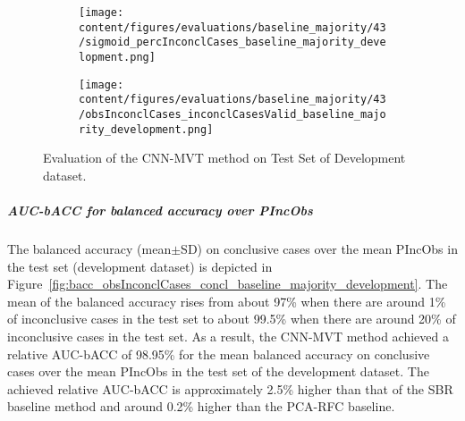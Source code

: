 \begin{figure}[ht]
  \begin{subfigure}{0.48\textwidth}
    \centering
    \texttt{[image: content/figures/evaluations/baseline\_majority/43/sigmoid\_percInconclCases\_baseline\_majority\_development.png]}
    \label{fig:baseline_majority_percInconclCases_development}
  \end{subfigure}
  \hfill
  \begin{subfigure}{0.495\textwidth}
    \centering
    \texttt{[image: content/figures/evaluations/baseline\_majority/43/obsInconclCases\_inconclCasesValid\_baseline\_majority\_development.png]}
    \label{fig:obsInconclCases_inconclCasesValid_baseline_majority_development}
  \end{subfigure}

  \caption{Evaluation of the CNN-MVT method on Test Set of Development dataset.}
  \label{fig:eval_cnn_mvt_dev}
\end{figure}


\subparagraph{AUC-bACC for balanced accuracy over PIncObs}

The balanced accuracy (mean$\pm$SD) on conclusive cases over the mean PIncObs
in the test set (development dataset) 
is depicted in Figure~\ref{fig:bacc_obsInconclCases_concl_baseline_majority_development}.
The mean of the balanced accuracy rises from about 97\% 
when there are around 1\% of inconclusive cases in the test set to about 99.5\% 
when there are around 20\% of inconclusive cases in the test set.
As a result, the CNN-MVT method achieved a relative AUC-bACC of 98.95\% for the mean balanced accuracy on conclusive cases
over the mean PIncObs in the test set of the development dataset.
The achieved relative AUC-bACC is approximately 2.5\% higher than that of the SBR baseline method 
and around 0.2\% higher than the PCA-RFC baseline.



